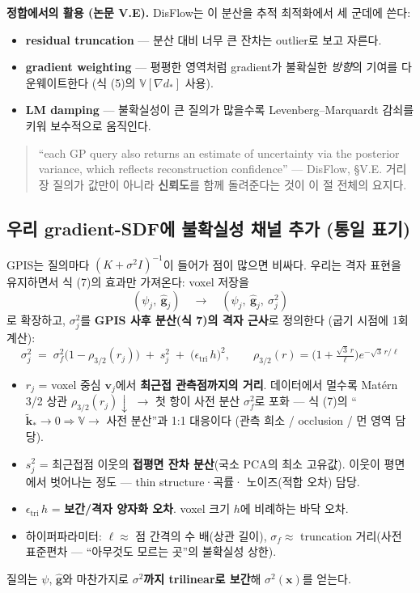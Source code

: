 \textbf{정합에서의 활용 (논문 V.E).} DisFlow는 이 분산을 추적
최적화에서 세 군데에 쓴다:
\begin{itemize}
  \item \textbf{residual truncation} --- 분산 대비 너무 큰 잔차는 outlier로
  보고 자른다.
  \item \textbf{gradient weighting} --- 평평한 영역처럼 gradient가
  불확실한 \emph{방향}의 기여를 다운웨이트한다 (식 (5)의
  $\mathbb{V}[\nabla d_*]$ 사용).
  \item \textbf{LM damping} --- 불확실성이 큰 질의가 많을수록
  Levenberg--Marquardt 감쇠를 키워 보수적으로 움직인다.
\end{itemize}

\begin{quote}
  \small ``each GP query also returns an estimate of uncertainty via the
  posterior variance, which reflects reconstruction confidence''
  --- DisFlow, \S V.E. 거리장 질의가 값만이 아니라 \textbf{신뢰도}를 함께
  돌려준다는 것이 이 절 전체의 요지다.
\end{quote}

\subsection{우리 gradient-SDF에 불확실성 채널 추가 (통일 표기)}

GPIS는 질의마다 $(K+\sigma^2 I)^{-1}$이 들어가 점이 많으면 비싸다. 우리는
격자 표현을 유지하면서 식 (7)의 효과만 가져온다: voxel 저장을
\begin{equation*}
  (\psi_j,\ \hat{\mathbf{g}}_j)
  \quad\longrightarrow\quad
  (\psi_j,\ \hat{\mathbf{g}}_j,\ \sigma_j^2)
\end{equation*}
로 확장하고, $\sigma_j^2$를 \textbf{GPIS 사후 분산(식 7)의 격자 근사}로
정의한다 (굽기 시점에 1회 계산):
\begin{equation*}
  \sigma_j^2 \;=\; \sigma_f^2\big(1-\rho_{3/2}(r_j)\big)
  \;+\; s_j^2
  \;+\; \big(\epsilon_{\text{tri}}\, h\big)^2,
  \qquad
  \rho_{3/2}(r) = \Big(1+\tfrac{\sqrt{3}\,r}{\ell}\Big)e^{-\sqrt{3}\,r/\ell}
\end{equation*}
\begin{itemize}
  \item $r_j$ = voxel 중심 $\mathbf{v}_j$에서 \textbf{최근접 관측점까지의
  거리}. 데이터에서 멀수록 Mat\'ern 3/2 상관 $\rho_{3/2}(r_j)\downarrow$
  $\to$ 첫 항이 사전 분산 $\sigma_f^2$로 포화 --- 식 (7)의
  ``$\tilde{\mathbf{k}}_*\to 0 \Rightarrow \mathbb{V}\to$ 사전 분산''과
  1:1 대응이다 (관측 희소 / occlusion / 먼 영역 담당).
  \item $s_j^2$ = 최근접점 이웃의 \textbf{접평면 잔차 분산}(국소 PCA의
  최소 고유값). 이웃이 평면에서 벗어나는 정도 --- thin structure·곡률·
  노이즈(적합 오차) 담당.
  \item $\epsilon_{\text{tri}}\, h$ = \textbf{보간/격자 양자화 오차}. voxel
  크기 $h$에 비례하는 바닥 오차.
  \item 하이퍼파라미터: $\ell \approx$ 점 간격의 수 배(상관 길이),
  $\sigma_f \approx$ truncation 거리(사전 표준편차 --- ``아무것도 모르는
  곳''의 불확실성 상한).
\end{itemize}
질의는 $\psi$, $\hat{\mathbf{g}}$와 마찬가지로 \textbf{$\sigma^2$까지
trilinear로 보간}해 $\sigma^2(\mathbf{x})$를 얻는다.

